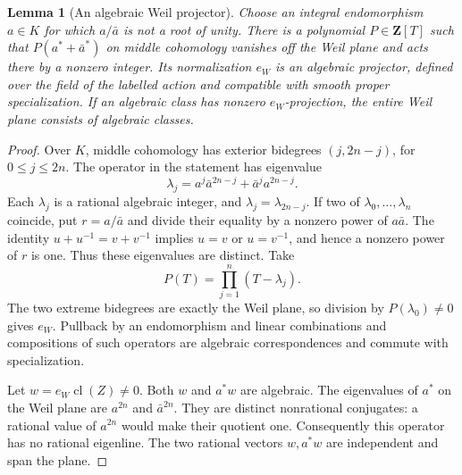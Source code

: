\documentclass[11pt]{article}
\newtheorem{lemma}[theorem]{Lemma}
\theoremstyle{definition}
\theoremstyle{remark}
\newcommand{\Z}{\mathbf Z}
\newcommand{\cl}{\operatorname{cl}}
\begin{document}
\begin{lemma}[An algebraic Weil projector]\label{lem:projector}
Choose an integral endomorphism $a\in K$ for which $a/\bar a$
is not a root of unity. There is a polynomial $P\in\Z[T]$ such
that $P(a^*+\bar a^*)$ on middle cohomology vanishes off the Weil
plane and acts there by a nonzero integer. Its normalization
$e_W$ is an algebraic projector, defined over the field of the
labelled action and compatible with smooth proper specialization.
If an algebraic class has nonzero $e_W$-projection, the entire
Weil plane consists of algebraic classes.
\end{lemma}
\begin{proof}
Over $K$, middle cohomology has exterior bidegrees
$(j,2n-j)$, for $0\leq j\leq2n$. The operator in the statement
has eigenvalue
\[
 \lambda_j=a^j\bar a^{2n-j}+\bar a^ja^{2n-j}.
\]
Each $\lambda_j$ is a rational algebraic integer, and
$\lambda_j=\lambda_{2n-j}$. If two of
$\lambda_0,\ldots,\lambda_n$ coincide, put $r=a/\bar a$ and
divide their equality by a nonzero power of $a\bar a$. The
identity $u+u^{-1}=v+v^{-1}$ implies $u=v$ or $u=v^{-1}$,
and hence a nonzero power of $r$ is one. Thus these eigenvalues
are distinct. Take
\[
 P(T)=\prod_{j=1}^{n}(T-\lambda_j).
\]
The two extreme bidegrees are exactly the Weil plane, so division
by $P(\lambda_0)\ne0$ gives $e_W$. Pullback by an endomorphism
and linear combinations and compositions of such operators are
algebraic correspondences and commute with specialization.

Let $w=e_W\cl(Z)\ne0$. Both $w$ and $a^*w$ are algebraic.
The eigenvalues of $a^*$ on the Weil plane are $a^{2n}$ and
$\bar a^{2n}$. They are distinct nonrational conjugates: a
rational value of $a^{2n}$ would make their quotient one.
Consequently this operator has no rational eigenline. The two
rational vectors $w,a^*w$ are independent and span the plane.
\end{proof}
\end{document}
